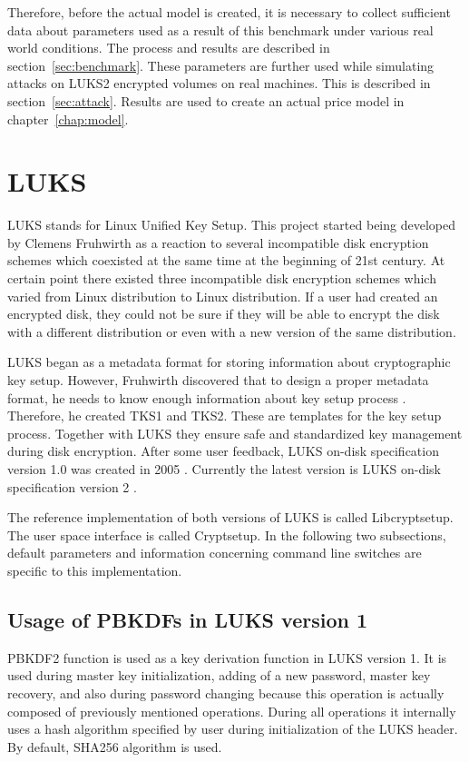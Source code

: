 \documentclass[nolof]{fithesis3}
\begin{document}
Therefore, before the actual model is created, it is necessary to collect sufficient data about parameters used as a result of this benchmark under various real world conditions. The process and results are described in section~\ref{sec:benchmark}. These parameters are further used while simulating attacks on LUKS2 encrypted volumes on real machines. This is described in section~\ref{sec:attack}. Results are used to create an actual price model in chapter~\ref{chap:model}.

\section{LUKS}
LUKS stands for Linux Unified Key Setup. This project started being developed by Clemens Fruhwirth as a reaction to several incompatible disk encryption schemes which coexisted at the same time at the beginning of 21st century. At certain point there existed three incompatible disk encryption schemes which varied from Linux distribution to Linux distribution. If a user had created an encrypted disk, they could not be sure if they will be able to encrypt the disk with a different distribution or even with a new version of the same distribution.

LUKS began as a metadata format for storing information about cryptographic key setup. However, Fruhwirth discovered that to design a proper metadata format, he needs to know enough information about key setup process \parencite{newmethods}. Therefore, he created TKS1 and TKS2. These are templates for the key setup process. Together with LUKS they ensure safe and standardized key management during disk encryption. After some user feedback, LUKS on-disk specification version 1.0 was created in 2005 \parencite{luks1}. Currently the latest version is LUKS on-disk specification version 2 \parencite{luks2}.

The reference implementation of both versions of LUKS is called Libcryptsetup. The user space interface is called Cryptsetup. In the following two subsections, default parameters and information concerning command line switches are specific to this implementation.

\subsection{Usage of PBKDFs in LUKS version 1}
\label{luks1}
PBKDF2 function is used as a key derivation function in LUKS version 1. It is used during master key initialization, adding of a new password, master key recovery, and also during password changing because this operation is actually composed of previously mentioned operations. During all operations it internally uses a hash algorithm specified by user during initialization of the LUKS header. By default, SHA256 algorithm is used.
\end{document}
